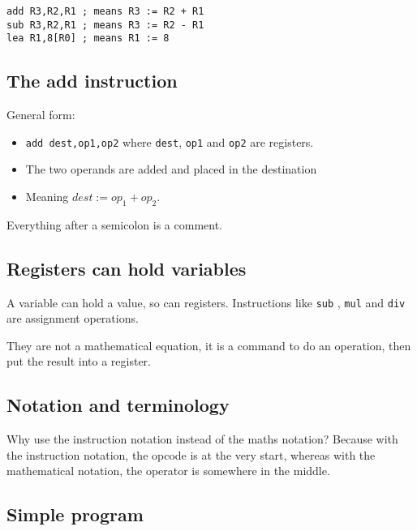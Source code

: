 \begin{verbatim}
add R3,R2,R1 ; means R3 := R2 + R1
sub R3,R2,R1 ; means R3 := R2 - R1
lea R1,8[R0] ; means R1 := 8
\end{verbatim}

\subsection{The add instruction}\label{sub:the_add_instruction}

General form:
\begin{itemize}
	\item \texttt{add dest,op1,op2} where \texttt{dest}, \texttt{op1} and \texttt{op2} are registers.
	\item The two operands are added and placed in the destination
	\item Meaning \(dest:=op_1+op_2\).
\end{itemize}

Everything after a semicolon is a comment.

\subsection{Registers can hold variables}\label{sub:registers_can_hold_variables}

A variable can hold a value, so can registers.
Instructions like \texttt{sub} , \texttt{mul} and \texttt{div} are assignment operations.

\begin{note}
	They are not a mathematical equation, it is a command to do an operation, then put the result into a register.
\end{note}

\subsection{Notation and terminology}\label{sub:notation_and_terminology}

Why use the instruction notation instead of the maths notation? Because with the instruction notation, the opcode is at the very start, whereas with the mathematical notation, the operator is somewhere in the middle.

\subsection{Simple program}\label{sub:simple_program}

